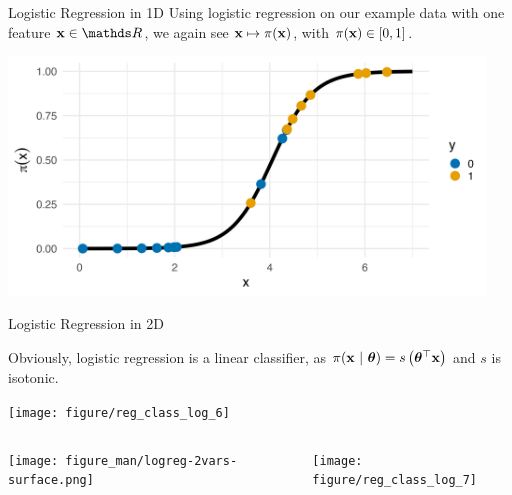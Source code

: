 \documentclass[11pt,compress,t,notes=noshow, xcolor=table]{beamer}
\begin{document}
\begin{vbframe}{Logistic Regression in 1D}
Using logistic regression on our example data with one feature $\xv \in \R$, we again see $\mathbf{x} \mapsto \pi(\mathbf{x})$, with $\pi(\mathbf{x}) \in [0,1]$.

\lz

{\centering \includegraphics[width=0.95\textwidth]{figure/preds_with_probs-logistic.png}
}

\end{vbframe}
\begin{vbframe}{Logistic Regression in 2D}

Obviously, logistic regression is a linear classifier, as $\pi(\mathbf{x}~|~ \bm{\theta}) = s\left( \bm{\theta}^\top \mathbf{x} \right)$ 
and $s$ is isotonic.

\lz
\begin{knitrout}\scriptsize
{}\color{fgcolor}

{\centering \texttt{[image: figure/reg\_class\_log\_6]}  

}

\end{knitrout}

\framebreak

\begin{columns}[T]
\begin{column}{0.5\textwidth}
  \texttt{[image: figure\_man/logreg-2vars-surface.png]}
\end{column}
\begin{column}{0.5\textwidth}
\begin{knitrout}\scriptsize
{}\color{fgcolor}

{\centering \texttt{[image: figure/reg\_class\_log\_7]} 

}

\end{knitrout}
\end{column}
\end{columns}

\end{vbframe}

\endlecture
\end{document}

